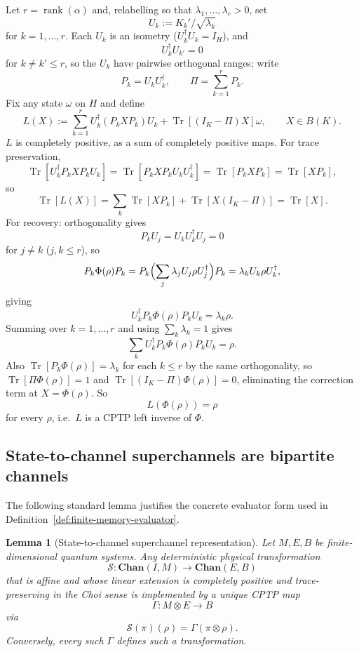 \documentclass[11pt]{article}
\newtheorem{lemma}[theorem]{Lemma}
\DeclareMathOperator{\Tr}{Tr}
\DeclareMathOperator{\rank}{rank}
\begin{document}
Let $r=\rank(\alpha)$ and, relabelling so that
$\lambda_1,\dots,\lambda_r>0$, set
\[
U_k:=K_k'/\sqrt{\lambda_k}
\]
for $k=1,\dots,r$. Each $U_k$ is an isometry ($U_k^\dagger U_k=I_H$), and
\[
U_k^\dagger U_{k'}=0
\]
for $k\neq k'\le r$, so the $U_k$ have pairwise orthogonal ranges; write
\[
P_k=U_kU_k^\dagger,
\qquad
\Pi=\sum_{k=1}^r P_k.
\]
Fix any state $\omega$ on $H$ and define
\[
L(X):=
\sum_{k=1}^r U_k^\dagger(P_kXP_k)U_k
+
\Tr[(I_K-\Pi)X]\omega,
\qquad
X\in B(K).
\]
$L$ is completely positive, as a sum of completely positive maps. For trace
preservation,
\[
\Tr[U_k^\dagger P_kXP_kU_k]
=
\Tr[P_kXP_kU_kU_k^\dagger]
=
\Tr[P_kXP_k]
=
\Tr[XP_k],
\]
so
\[
\Tr[L(X)]
=
\sum_k\Tr[XP_k]+\Tr[X(I_K-\Pi)]
=
\Tr[X].
\]
For recovery: orthogonality gives
\[
P_kU_j=U_kU_k^\dagger U_j=0
\]
for $j\neq k$ ($j,k\le r$), so
\[
P_k\Phi(\rho)P_k
=
P_k\Bigl(\sum_j\lambda_j U_j\rho U_j^\dagger\Bigr)P_k
=
\lambda_k U_k\rho U_k^\dagger,
\]
giving
\[
U_k^\dagger P_k\Phi(\rho)P_kU_k=\lambda_k\rho.
\]
Summing over $k=1,\dots,r$ and using $\sum_k\lambda_k=1$ gives
\[
\sum_k U_k^\dagger P_k\Phi(\rho)P_kU_k=\rho.
\]
Also $\Tr[P_k\Phi(\rho)]=\lambda_k$ for each $k\le r$ by the same
orthogonality, so $\Tr[\Pi\Phi(\rho)]=1$ and
$\Tr[(I_K-\Pi)\Phi(\rho)]=0$, eliminating the correction term at
$X=\Phi(\rho)$. So
\[
L(\Phi(\rho))=\rho
\]
for every $\rho$, i.e.\ $L$ is a CPTP left inverse of $\Phi$.

\subsection*{State-to-channel superchannels are bipartite channels}

The following standard lemma justifies the concrete evaluator form used in
Definition~\ref{def:finite-memory-evaluator}.

\begin{lemma}[State-to-channel superchannel representation]
\label{lem:state-channel-superchannel}
Let $M,E,B$ be finite-dimensional quantum systems. Any deterministic
physical transformation
\[
\mathcal S:\mathbf{Chan}(I,M)\longrightarrow \mathbf{Chan}(E,B)
\]
that is affine and whose linear extension is completely positive and
trace-preserving in the Choi sense is implemented by a unique CPTP map
\[
\Gamma:M\otimes E\longrightarrow B
\]
via
\[
\mathcal S(\pi)(\rho)=\Gamma(\pi\otimes\rho).
\]
Conversely, every such $\Gamma$ defines such a transformation.
\end{lemma}
\end{document}
